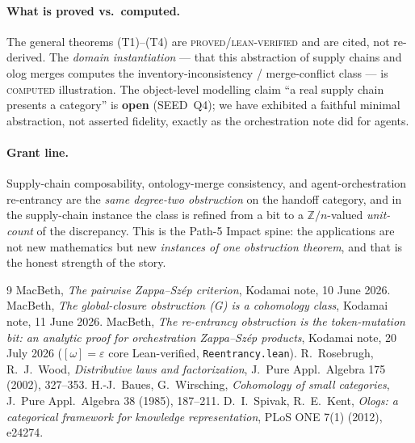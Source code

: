 \documentclass[11pt]{article}
\theoremstyle{definition}
\newcommand{\Zn}{\mathbb{Z}/n}
\begin{document}
\paragraph{What is proved vs.\ computed.} The general theorems (T1)--(T4) are
\textsc{proved}/\textsc{lean-verified} and are cited, not re-derived. The
\emph{domain instantiation} --- that this abstraction of supply chains and olog merges
computes the inventory-inconsistency / merge-conflict class --- is \textsc{computed}
illustration. The object-level modelling claim ``a real supply chain presents a
category'' is \textbf{open} (SEED~Q4); we have exhibited a faithful minimal
abstraction, not asserted fidelity, exactly as the orchestration note did for agents.

\paragraph{Grant line.} Supply-chain composability, ontology-merge consistency, and
agent-orchestration re-entrancy are the \emph{same degree-two obstruction} on the
handoff category, and in the supply-chain instance the class is refined from a bit to a
$\Zn$-valued \emph{unit-count} of the discrepancy. This is the Path-5 Impact spine: the
applications are not new mathematics but new \emph{instances of one obstruction
theorem}, and that is the honest strength of the story.

\begin{thebibliography}{9}
 MacBeth, \emph{The pairwise Zappa--Sz\'ep criterion}, Kodamai note,
10 June 2026.
 MacBeth, \emph{The global-closure obstruction (G) is a cohomology
class}, Kodamai note, 11 June 2026.
 MacBeth, \emph{The re-entrancy obstruction is the token-mutation bit:
an analytic proof for orchestration Zappa--Sz\'ep products}, Kodamai note, 20 July
2026 ($[\omega]=\varepsilon$ core Lean-verified, \texttt{Reentrancy.lean}).
 R.~Rosebrugh, R.~J.~Wood, \emph{Distributive laws and factorization},
J.\ Pure Appl.\ Algebra 175 (2002), 327--353.
 H.-J.~Baues, G.~Wirsching, \emph{Cohomology of small categories},
J.\ Pure Appl.\ Algebra 38 (1985), 187--211.
 D.~I.~Spivak, R.~E.~Kent, \emph{Ologs: a categorical framework for
knowledge representation}, PLoS ONE 7(1) (2012), e24274.
\end{thebibliography}
\end{document}
